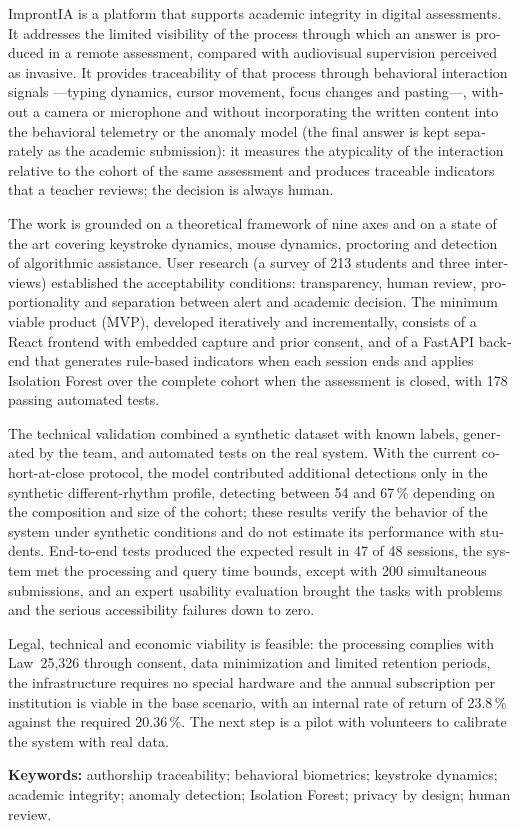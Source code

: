 \begin{otherlanguage}{english}

ImprontIA is a platform that supports academic integrity in digital assessments. It addresses the limited visibility of the process through which an answer is produced in a remote assessment, compared with audiovisual supervision perceived as invasive. It provides traceability of that process through behavioral interaction signals ---typing dynamics, cursor movement, focus changes and pasting---, without a camera or microphone and without incorporating the written content into the behavioral telemetry or the anomaly model (the final answer is kept separately as the academic submission): it measures the atypicality of the interaction relative to the cohort of the same assessment and produces traceable indicators that a teacher reviews; the decision is always human.

The work is grounded on a theoretical framework of nine axes and on a state of the art covering keystroke dynamics, mouse dynamics, proctoring and detection of algorithmic assistance. User research (a survey of 213 students and three interviews) established the acceptability conditions: transparency, human review, proportionality and separation between alert and academic decision. The minimum viable product (MVP), developed iteratively and incrementally, consists of a React frontend with embedded capture and prior consent, and of a FastAPI backend that generates rule-based indicators when each session ends and applies Isolation Forest over the complete cohort when the assessment is closed, with 178 passing automated tests.

The technical validation combined a synthetic dataset with known labels, generated by the team, and automated tests on the real system. With the current cohort-at-close protocol, the model contributed additional detections only in the synthetic different-rhythm profile, detecting between 54 and 67\,\% depending on the composition and size of the cohort; these results verify the behavior of the system under synthetic conditions and do not estimate its performance with students. End-to-end tests produced the expected result in 47 of 48 sessions, the system met the processing and query time bounds, except with 200 simultaneous submissions, and an expert usability evaluation brought the tasks with problems and the serious accessibility failures down to zero.

Legal, technical and economic viability is feasible: the processing complies with Law~25,326 through consent, data minimization and limited retention periods, the infrastructure requires no special hardware and the annual subscription per institution is viable in the base scenario, with an internal rate of return of 23.8\,\% against the required 20.36\,\%. The next step is a pilot with volunteers to calibrate the system with real data.

\vspace{4pt}
\noindent\textbf{Keywords:} authorship traceability; behavioral biometrics; keystroke dynamics; academic integrity; anomaly detection; Isolation Forest; privacy by design; human review.
\end{otherlanguage}
